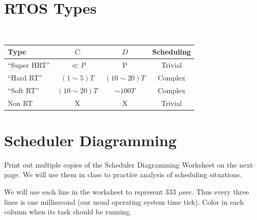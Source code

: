 
\section{RTOS Types}

{\tt
\begin{tabular}{|l|c|c|c|}
\hline
Type            & $C$               & $D$           & Scheduling        \\
\hline``Super HRT''   &  $\ll P$    & P             & Trivial           \\ \hline
``Hard RT''     &  $(1 \sim 5)T$        & $(10 \sim 20)T$        & Complex      \\ \hline
``Soft RT''     &  $(10 \sim 20)T$       & $\sim100T$    & Complex          \\ \hline
Non RT          &   X               & X             & Trivial           \\ \hline
\end{tabular}
}



\section{Scheduler Diagramming}
Print out multiple copies of the Scheduler Diagramming Worksheet on the next page. 
We will use them in class to practice analysis of scheduling situations. 

We will use each line in the worksheet to represent 333 $\mu$sec.  Thus every three lines
is one millisecond (our usual operating system time tick).   Color in each column when
its task should be running. 

\newpage
